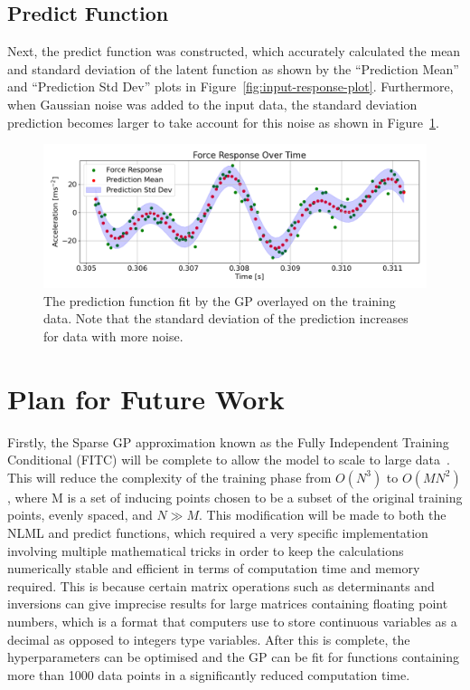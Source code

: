 \documentclass[12pt]{article}
\begin{document}
    \subsection{Predict Function}
    Next, the predict function was constructed, which accurately calculated the mean and standard deviation of the latent function as shown by the ``Prediction Mean'' and ``Prediction Std Dev'' plots in Figure~\ref{fig:input-response-plot}.
    Furthermore, when Gaussian noise was added to the input data, the standard deviation prediction becomes larger to take account for this noise as shown in Figure~\ref{fig:input-response-noise}.


    \begin{figure}[ht]
        \centering
        \includegraphics[width=1.0\linewidth]{figures/input-response-noise/input-response-noise.png}
        \caption{The prediction function fit by the GP overlayed on the training data. Note that the standard deviation of the prediction increases for data with more noise.}
        \label{fig:input-response-noise}
    \end{figure}

    \section{Plan for Future Work}
    Firstly, the Sparse GP approximation known as the Fully Independent Training Conditional (FITC) will be complete to allow the model to scale to large data~\cite{q-candela}.
    This will reduce the complexity of the training phase from $O(N^3)$ to $O(MN^2)$, where M is a set of inducing points chosen to be a subset of the original training points, evenly spaced, and $N \gg M$.  
    This modification will be made to both the NLML and predict functions, which required a very specific implementation involving multiple mathematical tricks in order to keep the calculations numerically stable and efficient in terms of computation time and memory required.
    This is because certain matrix operations such as determinants and inversions can give imprecise results for large matrices containing floating point numbers, which is a format that computers use to store continuous variables as a decimal as opposed to integers type variables.
    After this is complete, the hyperparameters can be optimised and the GP can be fit for functions containing more than 1000 data points in a significantly reduced computation time.
\end{document}
